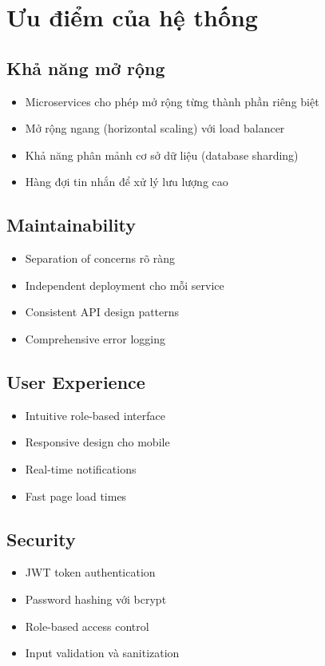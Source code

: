 \documentclass[12pt,a4paper]{report}
\begin{document}
    \section{Ưu điểm của hệ thống}

    \subsection{Khả năng mở rộng}
    \begin{itemize}
        \item Microservices cho phép mở rộng từng thành phần riêng biệt
        \item Mở rộng ngang (horizontal scaling) với load balancer
        \item Khả năng phân mảnh cơ sở dữ liệu (database sharding)
        \item Hàng đợi tin nhắn để xử lý lưu lượng cao
    \end{itemize}

    \subsection{Maintainability}
    \begin{itemize}
        \item Separation of concerns rõ ràng
        \item Independent deployment cho mỗi service
        \item Consistent API design patterns
        \item Comprehensive error logging
    \end{itemize}

    \subsection{User Experience}
    \begin{itemize}
        \item Intuitive role-based interface
        \item Responsive design cho mobile
        \item Real-time notifications
        \item Fast page load times
    \end{itemize}

    \subsection{Security}
    \begin{itemize}
        \item JWT token authentication
        \item Password hashing với bcrypt
        \item Role-based access control
        \item Input validation và sanitization
    \end{itemize}
\end{document}
